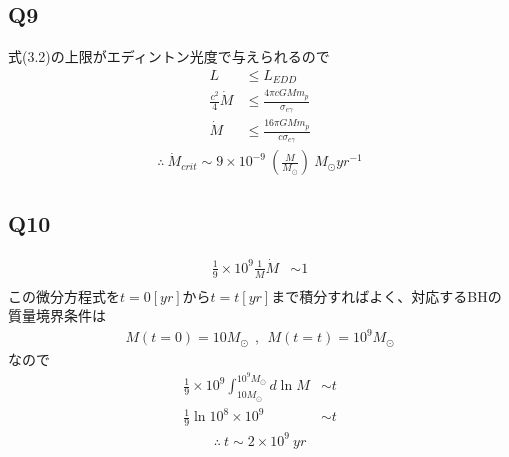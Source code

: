 \subsection{Q9}
式(3.2)の上限がエディントン光度で与えられるので
\begin{align*}
    L&\leq L_{EDD}\\
    \frac{c^2}{4}\Dot{M}&\leq\frac{4\pi cGMm_p}{\sigma_{e\gamma}}\\
    \Dot{M}&\leq\frac{16\pi GMm_p}{c\sigma_{e\gamma}}
\end{align*}
\begin{align}
    \therefore\ \Dot{M}_{crit}\sim9\times10^{-9}\ \left(\frac{M}{M_{\odot}}\right)\ M_{\odot}yr^{-1}
\end{align}
\subsection{Q10}
\begin{align*}
    \frac{1}{9}\times10^9\frac{1}{M}\Dot{M}&\sim1\\
\end{align*}
この微分方程式を$t=0[yr]$から$t=t[yr]$まで積分すればよく、対応するBHの質量境界条件は
\begin{align*}
    M(t=0)=10M_{\odot}\ \ ,\ \ M(t=t)=10^9M_{\odot}
\end{align*}
なので
\begin{align*}
    \frac{1}{9}\times10^9\int^{10^9M_{\odot}}_{10M_{\odot}}d\ln{M}&\sim t\\
    \frac{1}{9}\ln{10^8}\times10^9&\sim t
\end{align*}
\begin{align}
    \therefore\ t\sim2\times10^9\ yr
\end{align}